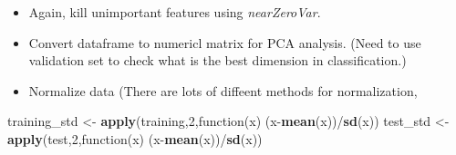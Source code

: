 \documentclass[]{article}
\newenvironment{Shaded}{\begin{snugshade}}{\end{snugshade}}
\newcommand{\KeywordTok}[1]{\textcolor[rgb]{0.13,0.29,0.53}{\textbf{{#1}}}}
\newcommand{\DataTypeTok}[1]{\textcolor[rgb]{0.13,0.29,0.53}{{#1}}}
\newcommand{\DecValTok}[1]{\textcolor[rgb]{0.00,0.00,0.81}{{#1}}}
\newcommand{\StringTok}[1]{\textcolor[rgb]{0.31,0.60,0.02}{{#1}}}
\newcommand{\CommentTok}[1]{\textcolor[rgb]{0.56,0.35,0.01}{\textit{{#1}}}}
\newcommand{\OtherTok}[1]{\textcolor[rgb]{0.56,0.35,0.01}{{#1}}}
\newcommand{\NormalTok}[1]{{#1}}
\begin{document}
\begin{itemize}
\itemsep1pt\parskip0pt
\item
  Again, kill unimportant features using \emph{nearZeroVar}.
\end{itemize}

\begin{Shaded}
\end{Shaded}

\begin{itemize}
\itemsep1pt\parskip0pt
\item
  Convert dataframe to numericl matrix for PCA analysis. (Need to use
  validation set to check what is the best dimension in classification.)
\end{itemize}

\begin{Shaded}
\end{Shaded}

\begin{itemize}
\itemsep1pt\parskip0pt
\item
  Normalize data (There are lots of diffeent methods for normalization,
\end{itemize}

\begin{Shaded}
\begin{Highlighting}[]
\NormalTok{training_std <-}\StringTok{ }\KeywordTok{apply}\NormalTok{(training,}\DecValTok{2}\NormalTok{,function(x) (x-}\KeywordTok{mean}\NormalTok{(x))/}\KeywordTok{sd}\NormalTok{(x))}
\NormalTok{test_std <-}\StringTok{ }\KeywordTok{apply}\NormalTok{(test,}\DecValTok{2}\NormalTok{,function(x) (x-}\KeywordTok{mean}\NormalTok{(x))/}\KeywordTok{sd}\NormalTok{(x))}
\end{Highlighting}
\end{Shaded}
\end{document}
